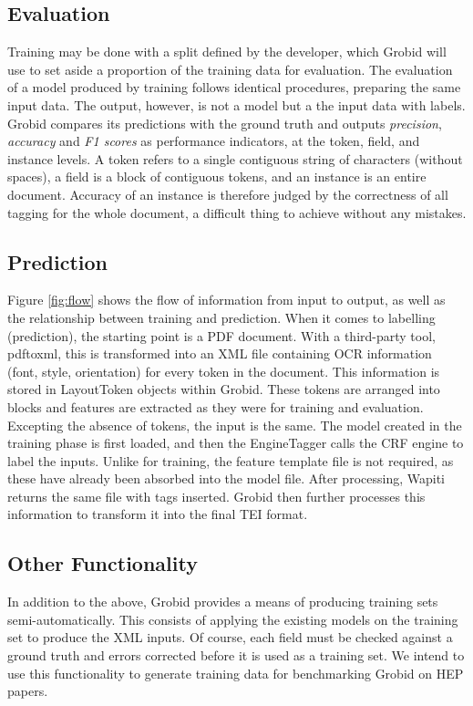 \subsection{Evaluation}

Training may be done with a split defined by the developer, which Grobid will use to set aside a proportion of the training data for evaluation. The evaluation of a model produced by training follows identical procedures, preparing the same input data. The output, however, is not a model but a the input data with labels. Grobid compares its predictions with the ground truth and outputs \emph{precision}, \emph{accuracy} and \emph{F1 scores} as performance indicators, at the token, field, and instance levels. A token refers to a single contiguous string of characters (without spaces), a field is a block of contiguous tokens, and an instance is an entire document. Accuracy of an instance is therefore judged by the correctness of all tagging for the whole document, a difficult thing to achieve without any mistakes.

\subsection{Prediction}

Figure \ref{fig:flow} shows the flow of information from input to output, as well as the relationship between training and prediction. When it comes to labelling (prediction), the starting point is a PDF document. With a third-party tool, pdftoxml, this is transformed into an XML file containing OCR information (font, style, orientation) for every token in the document. This information is stored in LayoutToken objects within Grobid. These tokens are arranged into blocks and features are extracted as they were for training and evaluation. Excepting the absence of tokens, the input is the same. The model created in the training phase is first loaded, and then the EngineTagger calls the CRF engine to label the inputs. Unlike for training, the feature template file is not required, as these have already been absorbed into the model file. After processing, Wapiti returns the same file with tags inserted. Grobid then further processes this information to transform it into the final TEI format.

\subsection{Other Functionality}

In addition to the above, Grobid provides a means of producing training sets semi-automatically. This consists of applying the existing models on the training set to produce the XML inputs. Of course, each field must be checked against a ground truth and errors corrected before it is used as a training set. We intend to use this functionality to generate training data for benchmarking Grobid on HEP papers.

